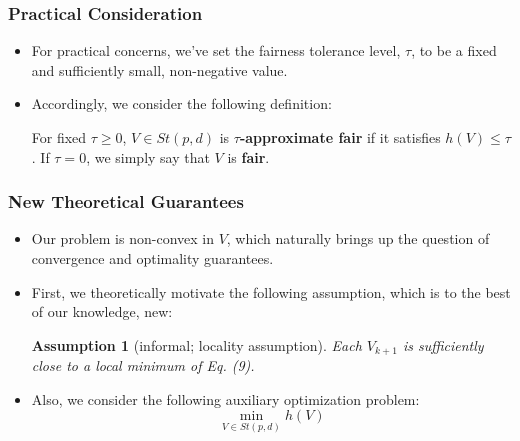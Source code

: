 \documentclass{beamer}
\newtheorem{assumption}{Assumption}
\begin{document}
\begin{frame}
	\frametitle{Practical Consideration}
	\begin{itemize}
		\item For practical concerns, we’ve set the fairness tolerance level, $\tau$, to be a fixed and sufficiently small, non-negative value.
		
		\item Accordingly, we consider the following definition:
		\begin{definition}
			\label{def:approx-fair}
			For fixed $\tau \geq 0$, $V \in St(p, d)$ is {\bf $\tau$-approximate fair} if it satisfies $h(V) \leq \tau$.
			If $\tau = 0$, we simply say that $V$ is {\bf fair}.
		\end{definition}
	\end{itemize}
\end{frame}


\begin{frame}
	\frametitle{New Theoretical Guarantees}
	\begin{itemize}
		\item Our problem is non-convex in $V$, which naturally brings up the question of convergence and optimality guarantees.
		
		\item First, we theoretically motivate the following assumption, which is to the best of our knowledge, new:
		\begin{assumption}[informal; locality assumption]
			\label{assumption:1}
			Each $V_{k+1}$ is sufficiently close to a local minimum of Eq. (9).
		\end{assumption}
	
		\item Also, we consider the following auxiliary optimization problem:
		\begin{equation}
			\label{eq:auxiliary}
			\min_{V \in St(p, d)} h(V)
		\end{equation}
	\end{itemize}
\end{frame}
\end{document}
